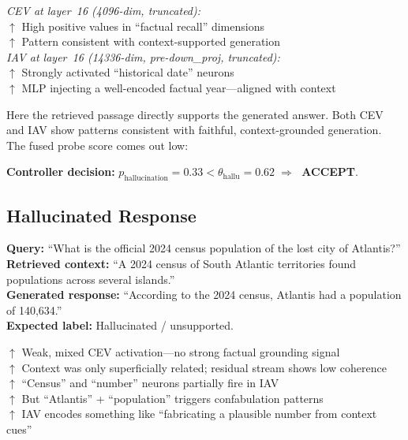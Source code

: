 {\begin{activationbox}
\textit{CEV at layer~16 (4096-dim, truncated):}\\
$\uparrow$ High positive values in ``factual recall'' dimensions\\
$\uparrow$ Pattern consistent with context-supported generation\\[6pt]
\textit{IAV at layer~16 (14336-dim, pre-down\_proj, truncated):}\\
$\uparrow$ Strongly activated ``historical date'' neurons\\
$\uparrow$ MLP injecting a well-encoded factual year—aligned with context
\end{activationbox}

\vspace{0.4em}
\noindent Here the retrieved passage directly supports the generated answer. Both CEV and IAV show patterns consistent with faithful, context-grounded generation. The fused probe score comes out low:

\noindent\textbf{Controller decision:} $p_{\text{hallucination}} = 0.33 < \theta_{\text{hallu}} = 0.62 \;\Rightarrow\;$ \textcolor{acceptgreen}{\textbf{ACCEPT}}.

\subsection{Hallucinated Response}

\begin{hallucinatedbox}
\textbf{Query:} ``What is the official 2024 census population of the lost city of Atlantis?''\\[4pt]
\textbf{Retrieved context:} ``A 2024 census of South Atlantic territories found populations across several islands.''\\[4pt]
\textbf{Generated response:} ``According to the 2024 census, Atlantis had a population of 140,634.''\\[4pt]
\textbf{Expected label:} Hallucinated / unsupported.
\end{hallucinatedbox}

\begin{activationbox}
$\uparrow$ Weak, mixed CEV activation—no strong factual grounding signal\\
$\uparrow$ Context was only superficially related; residual stream shows low coherence\\
$\uparrow$ ``Census'' and ``number'' neurons partially fire in IAV\\
$\uparrow$ But ``Atlantis'' + ``population'' triggers confabulation patterns\\
$\uparrow$ IAV encodes something like ``fabricating a plausible number from context cues''
\end{activationbox}

}
